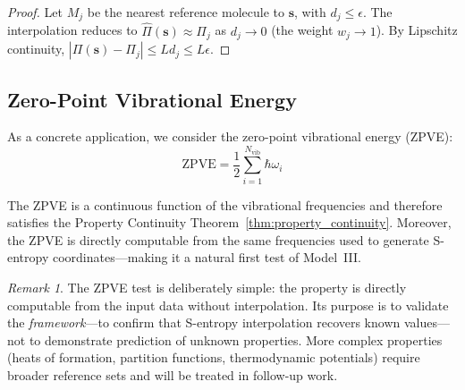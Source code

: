 \documentclass[11pt,twocolumn,a4paper]{article}
\theoremstyle{definition}
\theoremstyle{remark}
\newtheorem{remark}[theorem]{Remark}
\newcommand{\Nvib}{N_{\mathrm{vib}}}
\begin{document}
\begin{proof}
Let $M_j$ be the nearest reference molecule to $\mathbf{s}$, with $d_j \leq \epsilon$. The interpolation reduces to $\hat{\Pi}(\mathbf{s}) \approx \Pi_j$ as $d_j \to 0$ (the weight $w_j \to 1$). By Lipschitz continuity, $|\Pi(\mathbf{s}) - \Pi_j| \leq L d_j \leq L\epsilon$.
\end{proof}

\subsection{Zero-Point Vibrational Energy}

As a concrete application, we consider the zero-point vibrational energy (ZPVE):
\begin{equation}
\text{ZPVE} = \frac{1}{2} \sum_{i=1}^{\Nvib} \hbar \omega_i
\label{eq:zpve}
\end{equation}

The ZPVE is a continuous function of the vibrational frequencies and therefore satisfies the Property Continuity Theorem~\ref{thm:property_continuity}. Moreover, the ZPVE is directly computable from the same frequencies used to generate S-entropy coordinates---making it a natural first test of Model~III.

\begin{remark}
The ZPVE test is deliberately simple: the property is directly computable from the input data without interpolation. Its purpose is to validate the \emph{framework}---to confirm that S-entropy interpolation recovers known values---not to demonstrate prediction of unknown properties. More complex properties (heats of formation, partition functions, thermodynamic potentials) require broader reference sets and will be treated in follow-up work.
\end{remark}
\end{document}

